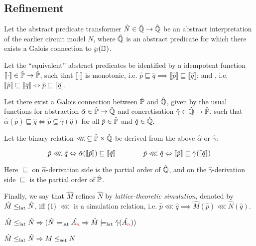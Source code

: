 \subsection{Refinement}

Let the abstract predicate transformer $\hat N \in \hat{\mathbb{Q}} \rightarrow \hat{\mathbb{Q}}$ be an abstract interpretation of the earlier circuit model $N$, where $\hat{\mathbb{Q}}$ is an abstract predicate for which there exists a Galois connection to $\wp(\mathbb{D})$.

Let the ``equivalent'' abstract predicates be identified by a idempotent function $\llbracket \cdot \rrbracket \in \hat{\mathbb{P}} \rightarrow \hat{\mathbb{P}}$, such that $\llbracket \cdot \rrbracket$ is monotonic, i.e. $\hat p \sqsubseteq \hat q \implies \llbracket \hat p \rrbracket \sqsubseteq \llbracket \hat q \rrbracket$; and , i.e. $\llbracket \hat p \rrbracket \sqsubseteq \llbracket \hat q \rrbracket \iff \hat p \sqsubseteq \llbracket \hat q \rrbracket$.

Let there exist a Galois connection between $\hat{\mathbb{P}}$ and $\hat{\mathbb{Q}}$, given by the usual functions for abstraction $\hat \alpha \in \hat{\mathbb{P}} \rightarrow \hat{\mathbb{Q}}$ and concretisation $\hat \gamma \in \hat{\mathbb{Q}} \rightarrow \hat{\mathbb{P}}$, such that $\hat \alpha(\hat p) \sqsubseteq \hat q \iff \hat p \subseteq \hat \gamma(\hat q)$ for all $\hat p \in \hat{\mathbb{P}}$ and $\hat q \in \hat{\mathbb{Q}}$.

Let the binary relation $\lll \, \subseteq \hat{\mathbb{P}} \times \hat{\mathbb{Q}}$ be derived from the above $\hat \alpha$ or $\hat \gamma$:

\begin{equation*}
\hat p \lll \hat q \Leftrightarrow \hat \alpha(\llbracket \hat p \rrbracket) \sqsubseteq \llbracket \hat q \rrbracket \quad\quad\quad\quad \hat p \lll \hat q \Leftrightarrow \llbracket \hat p \rrbracket \sqsubseteq \hat \gamma(\llbracket \hat q \rrbracket)
\end{equation*}

\noindent Here $\sqsubseteq$ on $\hat \alpha$-derivation side is the partial order of $\hat{\mathbb{Q}}$, and on the $\hat \gamma$-derivation side $\sqsubseteq$ is the partial order of $\hat{\mathbb{P}}$.

Finally, we say that $\hat M$ refines $\hat N$ by \textit{lattice-theoretic simulation}, denoted by $\hat M \leq_{\textrm{lat}} \hat N$, iff (1) $\lll$ is a simulation relation, i.e. $\hat p \lll \hat q \implies \hat M(\hat p) \lll \hat N(\hat q)$.

\begin{theorem}
$\hat M \leq_{\textrm{lat}} \hat N \Rightarrow (\hat N \models_{\textrm{lat}} \hat {A_{\textcolor{red}{n}}} \Rightarrow \hat M \models_{\textrm{lat}} \hat \gamma(\hat {A_{\textcolor{red}{n}}}))$
\end{theorem}

\begin{theorem}
$\hat M \leq_{\textrm{lat}} \hat N \Rightarrow M \leq_{\textrm{set}} N$
\end{theorem}

